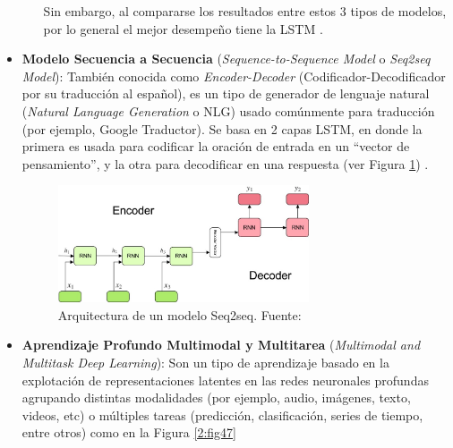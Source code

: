 \begin{itemize}
\begin{itemize}
		Sin embargo, al compararse los resultados entre estos 3 tipos de modelos, por lo general el mejor desempeño tiene la LSTM \parencite{bk_brownlee2017deeplearning_nlp}.
	\end{itemize}
	
	\item \textbf{Modelo Secuencia a Secuencia} (\textit{Sequence-to-Sequence Model} o \textit{Seq2seq Model}): También conocida como \textit{Encoder-Decoder} (Codificador-Decodificador por su traducción al español), es un tipo de generador de lenguaje natural (\textit{Natural Language Generation} o NLG) usado comúnmente para traducción (por ejemplo, Google Traductor). Se basa en 2 capas LSTM, en donde la primera es usada para codificar la oración de entrada en un “vector de pensamiento”, y la otra para decodificar en una respuesta (ver Figura \ref{2:fig46}) \parencite{bk_deng2018deeplearningnlp}.
	
	\begin{figure}[!ht]
		\begin{center}
			\includegraphics[width=0.7\textwidth]{2/figures/encoder-decoder.jpeg}
			\caption{Arquitectura de un modelo Seq2seq. Fuente: \cite{tec_kostadinov2019seq2seq}}
			\label{2:fig46}
		\end{center}
	\end{figure}
	
	\item \textbf{Aprendizaje Profundo Multimodal y Multitarea} (\textit{Multimodal and Multitask Deep Learning}): Son un tipo de aprendizaje basado en la explotación de representaciones latentes en las redes neuronales profundas agrupando distintas modalidades (por ejemplo, audio, imágenes, texto, videos, etc) o múltiples tareas (predicción, clasificación, series de tiempo, entre otros) como en la Figura \ref{2:fig47} \parencite{bk_deng2018deeplearningnlp}
	

\end{itemize}
